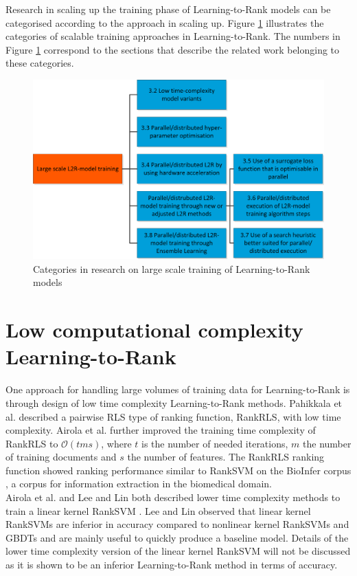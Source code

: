 Research in scaling up the training phase of Learning-to-Rank models can be categorised according to the approach in scaling up. Figure \ref{fig:related_work_categories} illustrates the categories of scalable training approaches in Learning-to-Rank. The numbers in Figure \ref{fig:related_work_categories} correspond to the sections that describe the related work belonging to these categories.

\begin{figure}
\includegraphics{gfx/related_work_categories}
\caption{Categories in research on large scale training of  Learning-to-Rank models}
\label{fig:related_work_categories}
\end{figure}

\section{Low computational complexity Learning-to-Rank}
\label{sec:related_work_low_complexity}
One approach for handling large volumes of training data for Learning-to-Rank is through design of low time complexity Learning-to-Rank methods. Pahikkala et al. \cite{Pahikkala2009} described a pairwise \ac{RLS} type of ranking function, RankRLS, with low time complexity. Airola et al. \cite{Airola2010} further improved the training time complexity of RankRLS to $\mathcal{O}(tms)$, where $t$ is the number of needed iterations, $m$ the number of training documents and $s$ the number of features. The RankRLS ranking function showed ranking performance similar to RankSVM \cite{Herbrich1999, Joachims2002} on the BioInfer corpus \cite{Pyysalo2007}, a corpus for information extraction in the biomedical domain.\\

Airola et al. \cite{Airola2011} and Lee and Lin \cite{Lee2014} both described lower time complexity methods to train a linear kernel RankSVM \cite{Herbrich1999, Joachims2002}. Lee and Lin \cite{Lee2014} observed that linear kernel RankSVMs are inferior in accuracy compared to nonlinear kernel RankSVMs and \ac{GBDT}s and are mainly useful to quickly produce a baseline model. Details of the lower time complexity version of the linear kernel RankSVM will not be discussed as it is shown to be an inferior Learning-to-Rank method in terms of accuracy.\\

